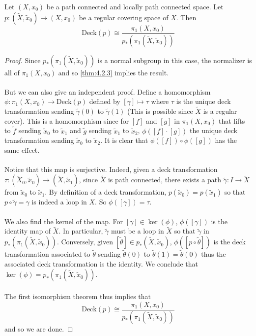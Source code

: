 \documentclass[a4paper]{article}
\begin{document}
\begin{crl}{}{} Let $(X,x_0)$ be a path connected and locally path connected space. Let $p:(\tilde{X},\tilde{x}_0)\to(X,x_0)$ be a regular covering space of $X$. Then $$\text{Deck}(p)\cong\frac{\pi_1(X,x_0)}{p_\ast\left(\pi_1(\tilde{X},\tilde{x}_0)\right)}$$ \tcbline
\begin{proof}
Since $p_\ast(\pi_1(\tilde{X},\tilde{x}_0))$ is a normal subgroup in this case, the normalizer is all of $\pi_1(X,x_0)$ and so \ref{thm:4.2.3} implies the result. \\~\\

But we can also give an independent proof. Define a homomorphism $\phi:\pi_1(X,x_0)\to\text{Deck}(p)$ defined by $[\gamma]\mapsto\tau$ where $\tau$ is the unique deck transformation sending $\tilde{\gamma}(0)$ to $\tilde{\gamma}(1)$ (This is possible since $\tilde{X}$ is a regular cover). This is a homomorphism since for $[f]$ and $[g]$ in $\pi_1(X,x_0)$ that lifts to $\tilde{f}$ sending $\tilde{x}_0$ to $\tilde{x}_1$ and $\tilde{g}$ sending $\tilde{x}_1$ to $\tilde{x}_2$, $\phi([f]\cdot[g])$ the unique deck transformation sending $\tilde{x}_0$ to $\tilde{x}_2$. It is clear that $\phi([f])\circ\phi([g])$ has the same effect. \\~\\

Notice that this map is surjective. Indeed, given a deck transformation $\tau:(\tilde{X}_0,\tilde{x}_0)\to(\tilde{X},\tilde{x}_1)$, since $\tilde{X}$ is path connected, there exists a path $\tilde{\gamma}:I\to\tilde{X}$ from $\tilde{x}_0$ to $\tilde{x}_1$. By definition of a deck transformation, $p(\tilde{x}_0)=p(\tilde{x}_1)$ so that $p\circ\tilde{\gamma}=\gamma$ is indeed a loop in $X$. So $\phi([\gamma])=\tau$. \\~\\

We also find the kernel of the map. For $[\gamma]\in\ker(\phi)$, $\phi([\gamma])$ is the identity map of $\tilde{X}$. In particular, $\tilde{\gamma}$ must be a loop in $\tilde{X}$ so that $\tilde{\gamma}$ in $p_\ast(\pi_1(\tilde{X},\tilde{x}_0))$. Conversely, given $[\tilde{\theta}]\in p_\ast(\tilde{X},\tilde{x}_0)$, $\phi([p\circ\tilde{\theta}])$ is the deck transformation associated to $\tilde{\theta}$ sending $\tilde{\theta}(0)$ to $\tilde{\theta}(1)=\tilde{\theta}(0)$ thus the associated deck transformation is the identity. We conclude that $\ker(\phi)=p_\ast(\pi_1(\tilde{X},\tilde{x}_0))$. \\~\\

The first isomorphism theorem thus implies that $$\text{Deck}(p)\cong\frac{\pi_1(X,x_0)}{p_\ast\left(\pi_1(\tilde{X},\tilde{x}_0)\right)}$$ and so we are done. 
\end{proof}
\end{crl}
\end{document}

